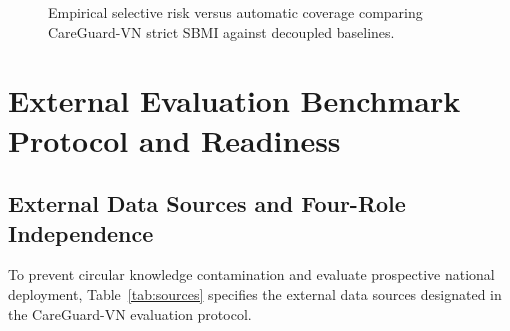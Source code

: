 \documentclass[11pt]{article}
\begin{document}
\begin{figure}[h]
\centering
{}
\caption{Empirical selective risk versus automatic coverage comparing CareGuard-VN strict SBMI against decoupled baselines.}
\label{fig:risk_coverage_analysis}
\end{figure}

\section{External Evaluation Benchmark Protocol and Readiness}

\subsection{External Data Sources and Four-Role Independence}
To prevent circular knowledge contamination and evaluate prospective national deployment, Table~\ref{tab:sources} specifies the external data sources designated in the CareGuard-VN evaluation protocol.
\end{document}
